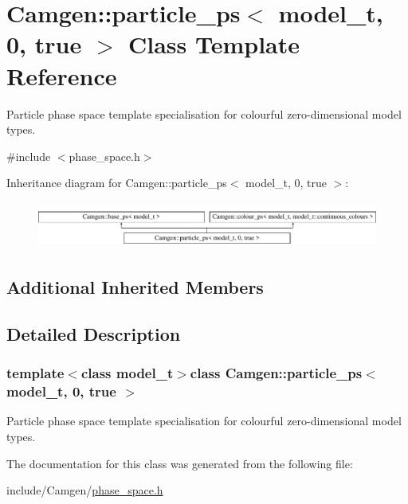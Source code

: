 \hypertarget{a00402}{\section{Camgen\-:\-:particle\-\_\-ps$<$ model\-\_\-t, 0, true $>$ Class Template Reference}
\label{a00402}
}


Particle phase space template specialisation for colourful zero-\/dimensional model types.  




{\ttfamily \#include $<$phase\-\_\-space.\-h$>$}

Inheritance diagram for Camgen\-:\-:particle\-\_\-ps$<$ model\-\_\-t, 0, true $>$\-:\begin{figure}[H]
\begin{center}
\leavevmode
\includegraphics[height=1.542700cm]{a00402}
\end{center}
\end{figure}
\subsection*{Additional Inherited Members}


\subsection{Detailed Description}
\subsubsection*{template$<$class model\-\_\-t$>$class Camgen\-::particle\-\_\-ps$<$ model\-\_\-t, 0, true $>$}

Particle phase space template specialisation for colourful zero-\/dimensional model types. 

The documentation for this class was generated from the following file\-:\begin{DoxyCompactItemize}
\item 
include/\-Camgen/\hyperlink{a00694}{phase\-\_\-space.\-h}\end{DoxyCompactItemize}

